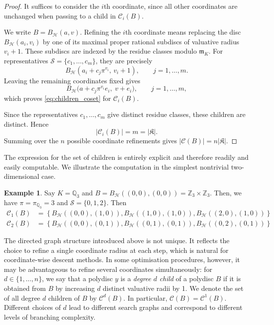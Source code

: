 \documentclass[10pt]{article}
\theoremstyle{definition}
\newtheorem{example}[theorem]{Example}
\newcommand{\ZZ}{\mathbb{Z}}
\newcommand{\QQ}{\mathbb{Q}}
\begin{document}
\begin{proof}

It suffices to consider the $i$th coordinate, since all other coordinates are unchanged when passing to a child in $\mathcal C_i(B)$.

We write $B=B_{\mathcal H}(a,v)$. Refining the $i$th coordinate means replacing the disc $B_{\mathcal H}(a_i,v_i)$ by one of its maximal proper rational subdiscs of valuative radius $v_i+1$. These subdiscs are indexed by the residue classes modulo $\mathfrak m_K$. For representatives $\mathcal S=\{c_1,\dots,c_m\}$, they are precisely
$$
B_{\mathcal H}(a_i+c_j\pi^{v_i},\, v_i+1),
\qquad j=1,\dots,m.
$$
Leaving the remaining coordinates fixed gives
$$
B_{\mathcal H}\big(a+c_j\pi^{v_i}e_i,\; v+e_i\big),
\qquad j=1,\dots,m,
$$
which proves \eqref{eq:children_coset} for \(\mathcal C_i(B)\).

Since the representatives $c_1,\dots,c_m$ give distinct residue classes, these children are distinct. Hence
$$
|\mathcal C_i(B)|=m=|\mathfrak K|.
$$
Summing over the $n$ possible coordinate refinements gives $|\mathcal C(B)|=n|\mathfrak K|$.
\end{proof}

The expression for the set of children is entirely explicit and therefore readily and easily computable. We illustrate the computation in the simplest nontrivial two-dimensional case.

\begin{example}
    Say $K = \QQ_3$ and $B = B_{\mathcal{H}}((0, 0), (0, 0)) = \ZZ_3 \times \ZZ_3$. Then, we have $\pi = \pi_{\mathbb Q_3} = 3$ and $\mathcal{S} = \{0, 1, 2\}$. Then
    \begin{align*}
            \mathcal{C}_1(B) & = \left\{ B_{\mathcal{H}}((0, 0), (1, 0)), B_{\mathcal{H}}((1, 0), (1, 0)), B_{\mathcal{H}}((2, 0), (1, 0)) \right\} \\
            \mathcal{C}_2(B) & = \left\{ B_{\mathcal{H}}((0, 0), (0, 1)), B_{\mathcal{H}}((0, 1), (0, 1)), B_{\mathcal{H}}((0, 2), (0, 1)) \right\}
    \end{align*}
\end{example}

The directed graph structure introduced above is not unique. It reflects the choice to refine a single coordinate radius at each step, which is natural for coordinate-wise descent methods. In some optimisation procedures, however, it may be advantageous to refine several coordinates simultaneously: for $d \in \{1,\dots,n\}$, we say that a polydisc $y$ is a \emph{degree $d$ child} of a polydisc $B$ if it is obtained from $B$ by increasing $d$ distinct valuative radii by 1. We denote the set of all degree $d$ children of $B$ by $\mathcal C^d(B)$. In particular, $\mathcal C(B)=\mathcal C^1(B).$ Different choices of $d$ lead to different search graphs and correspond to different levels of branching complexity.
\end{document}
